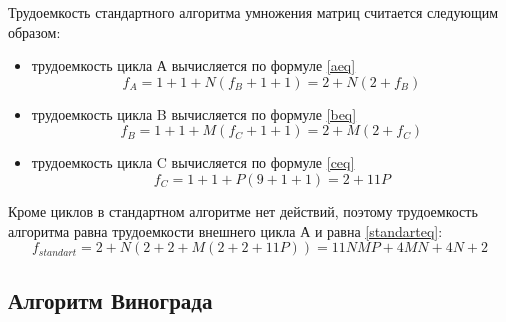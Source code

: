 Трудоемкость стандартного алгоритма умножения матриц считается следующим
образом:
\begin{itemize}[left=\parindent]
    \item трудоемкость цикла А вычисляется по формуле \ref{aeq}
        \begin{equation}\label{aeq}
            f_A = 1 + 1 + N(f_B + 1 + 1) = 2 + N(2 + f_B)
        \end{equation}
    \item трудоемкость цикла B вычисляется по формуле \ref{beq}
        \begin{equation}\label{beq}
            f_B = 1 + 1 + M(f_C + 1 + 1) = 2 + M(2 + f_C)
        \end{equation}
    \item трудоемкость цикла C вычисляется по формуле \ref{ceq}
        \begin{equation}\label{ceq}
            f_C = 1 + 1 + P(9 + 1 + 1) = 2 + 11P
        \end{equation}
\end{itemize}

Кроме циклов в стандартном алгоритме нет действий, поэтому трудоемкость
алгоритма равна трудоемкости внешнего цикла А и равна \ref{standarteq}:
\begin{equation}\label{standarteq}
    f_{standart} = 2 + N(2 + 2 + M(2 + 2 + 11P)) = 11NMP + 4MN + 4N + 2 
\end{equation}

\clearpage
\subsection{Алгоритм Винограда}

